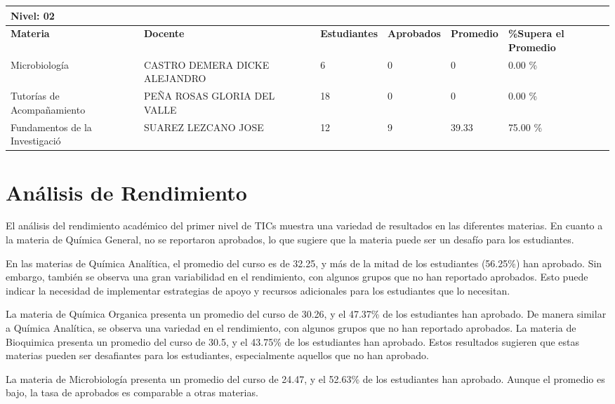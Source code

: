 \small
\begin{tabularx}{\textwidth}{|p{2.5cm}|p{2.5cm}|X|X|X|X|}
\hline
\multicolumn{6}{|X|}{\textbf{Nivel: 02 }}\\\hline\textbf{Materia} & \textbf{Docente} & \textbf{Estudiantes} & \textbf{Aprobados} & \textbf{Promedio} & \textbf{\%Supera el Promedio} \\ \hline
Microbiología & CASTRO DEMERA DICKE ALEJANDRO & 6 & 0 & 0 & 0.00 \%\\ \hline
Tutorías de Acompañamiento & PEÑA ROSAS GLORIA DEL VALLE & 18 & 0 & 0 & 0.00 \%\\ \hline
Fundamentos de la Investigació & SUAREZ LEZCANO JOSE  & 12 & 9 & 39.33 & 75.00 \%\\ \hline
\end{tabularx}

\vspace{1cm}
\section{Análisis de Rendimiento}
El análisis del rendimiento académico del primer nivel de TICs muestra una variedad de resultados en las diferentes materias. En cuanto a la materia de Química General, no se reportaron aprobados, lo que sugiere que la materia puede ser un desafío para los estudiantes.

En las materias de Química Analítica, el promedio del curso es de 32.25, y más de la mitad de los estudiantes (56.25\%) han aprobado. Sin embargo, también se observa una gran variabilidad en el rendimiento, con algunos grupos que no han reportado aprobados. Esto puede indicar la necesidad de implementar estrategias de apoyo y recursos adicionales para los estudiantes que lo necesitan.

La materia de Química Organica presenta un promedio del curso de 30.26, y el 47.37\% de los estudiantes han aprobado. De manera similar a Química Analítica, se observa una variedad en el rendimiento, con algunos grupos que no han reportado aprobados. La materia de Bioquimica presenta un promedio del curso de 30.5, y el 43.75\% de los estudiantes han aprobado. Estos resultados sugieren que estas materias pueden ser desafiantes para los estudiantes, especialmente aquellos que no han aprobado.

La materia de Microbiología presenta un promedio del curso de 24.47, y el 52.63\% de los estudiantes han aprobado. Aunque el promedio es bajo, la tasa de aprobados es comparable a otras materias.


